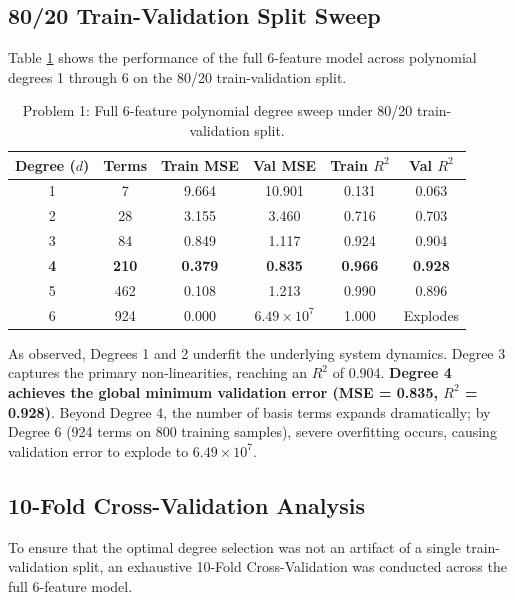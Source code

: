 \documentclass[12pt]{article}
\begin{document}
\subsection{80/20 Train-Validation Split Sweep}
Table \ref{tab:var1_8020} shows the performance of the full 6-feature model across polynomial degrees 1 through 6 on the 80/20 train-validation split.

\begin{table}[h]
\centering
\begin{tabular}{c c c c c c}
\toprule
\textbf{Degree ($d$)} & \textbf{Terms} & \textbf{Train MSE} & \textbf{Val MSE} & \textbf{Train $R^2$} & \textbf{Val $R^2$} \\
\midrule
1 & 7   & 9.664 & 10.901 & 0.131 & 0.063 \\
2 & 28  & 3.155 & 3.460  & 0.716 & 0.703 \\
3 & 84  & 0.849 & 1.117  & 0.924 & 0.904 \\
\textbf{4} & \textbf{210} & \textbf{0.379} & \textbf{0.835} & \textbf{0.966} & \textbf{0.928} \\
5 & 462 & 0.108 & 1.213  & 0.990 & 0.896 \\
6 & 924 & 0.000 & $6.49 \times 10^7$ & 1.000 & Explodes \\
\bottomrule
\end{tabular}
\caption{Problem 1: Full 6-feature polynomial degree sweep under 80/20 train-validation split.}
\label{tab:var1_8020}
\end{table}

As observed, Degrees 1 and 2 underfit the underlying system dynamics. Degree 3 captures the primary non-linearities, reaching an $R^2$ of $0.904$. \textbf{Degree 4 achieves the global minimum validation error (MSE = 0.835, $R^2$ = 0.928)}. Beyond Degree 4, the number of basis terms expands dramatically; by Degree 6 (924 terms on 800 training samples), severe overfitting occurs, causing validation error to explode to $6.49 \times 10^7$.

\subsection{10-Fold Cross-Validation Analysis}
To ensure that the optimal degree selection was not an artifact of a single train-validation split, an exhaustive 10-Fold Cross-Validation was conducted across the full 6-feature model.
\end{document}
